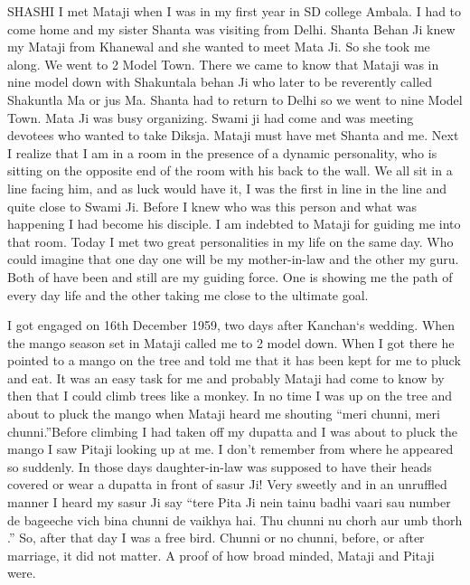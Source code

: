 SHASHI
I met Mataji when I was in my first year in SD college Ambala. I had to come home and my sister Shanta was visiting from Delhi. Shanta Behan Ji knew my Mataji from Khanewal and she wanted to meet Mata Ji. So she took me along. We went to 2 Model Town. There we came to know that Mataji was in nine model down with Shakuntala behan Ji who later to be reverently called Shakuntla Ma or jus Ma. Shanta had to return to Delhi so we went to nine Model Town. Mata Ji was busy organizing. Swami ji had come and was meeting devotees who wanted to take Diksja. Mataji must have met Shanta and me. Next I realize that I am in a room in the presence of a dynamic personality, who is sitting on the opposite end of the room with his back to the wall. We all sit in a line facing him, and as luck would have it, I was the first in line in the line and quite close to Swami Ji. Before I knew who was this person and what was happening I had become his disciple. I am indebted to Mataji for guiding me into that room. Today I met two great personalities in my life on the same day. Who could imagine that one day one will be my mother-in-law and the other my guru. Both of have been and still are my guiding force. One is showing me the path of every day life and the other taking me close to the ultimate goal.

I got engaged on 16th December 1959, two days after Kanchan‘s wedding. When the mango season set in Mataji called me to 2 model down. When I got there he pointed to a mango on the tree and told me that it has been kept for me to pluck and eat. It was an easy task for me and probably Mataji had come to know by then that I could climb trees like a monkey. In no time I was up on the tree and about to pluck the mango when Mataji heard me shouting “meri chunni, meri chunni.”Before climbing I had taken off my dupatta and I was about to pluck the mango I saw Pitaji looking up at me. I don’t remember from where he appeared so suddenly. In those days daughter-in-law was supposed to have their heads covered or wear a dupatta in front of sasur Ji! Very sweetly and in an unruffled manner I heard my sasur Ji say “tere Pita Ji nein tainu badhi vaari sau number de bageeche vich bina chunni de vaikhya hai. Thu chunni nu chorh aur umb thorh .” So, after that day I was a free bird. Chunni or no chunni, before, or after marriage, it did not matter. A proof of how broad minded, Mataji and Pitaji were.

